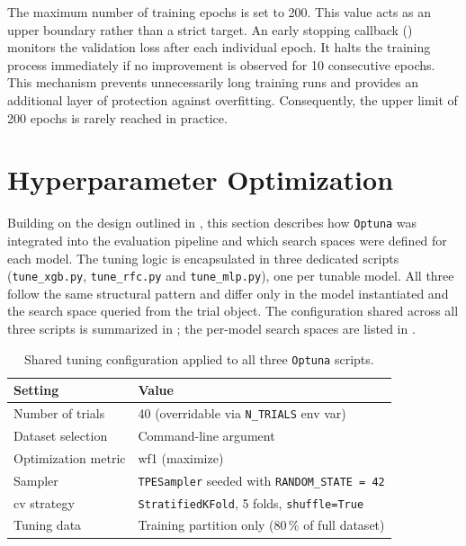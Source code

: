 The maximum number of training epochs is set to 200. This value acts as an upper boundary rather than a strict target. An early stopping callback () monitors the validation loss after each individual epoch. It halts the training process immediately if no improvement is observed for 10 consecutive epochs. This mechanism prevents unnecessarily long training runs and provides an additional layer of protection against overfitting. Consequently, the upper limit of 200 epochs is rarely reached in practice.




\section{Hyperparameter Optimization}
\label{implementation_tuning}

Building on the design outlined in , this section describes how \texttt{Optuna} was integrated into the evaluation pipeline and which search spaces were defined for each model. The tuning logic is encapsulated in three dedicated scripts (\texttt{tune\_xgb.py}, \texttt{tune\_rfc.py} and \texttt{tune\_mlp.py}), one per tunable model. All three follow the same structural pattern and differ only in the model instantiated and the search space queried from the trial object. The configuration shared across all three scripts is summarized in ; the per-model search spaces are listed in .

\begin{table}[htbp]
\centering
\caption{Shared tuning configuration applied to all three \texttt{Optuna} scripts.}
\label{tab:tuning_config}
\begin{tabular}{ll}
\toprule
\textbf{Setting} & \textbf{Value} \\
\midrule
Number of trials & 40 (overridable via \texttt{N\_TRIALS} env var) \\
Dataset selection & Command-line argument \\
Optimization metric & \gls{wf1} (maximize) \\
Sampler & \texttt{TPESampler} seeded with \texttt{RANDOM\_STATE = 42} \\
\gls{cv} strategy & \texttt{StratifiedKFold}, 5 folds, \texttt{shuffle=True} \\
Tuning data & Training partition only (80\,\% of full dataset) \\
\bottomrule
\end{tabular}
\end{table}

